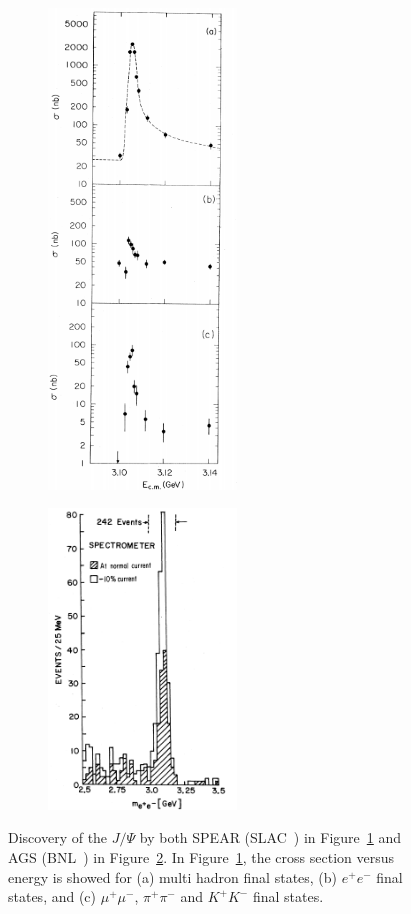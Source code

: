 	\begin{figure}[H]
		\begin{subfigure}{0.5\linewidth}
			\centering
			\includegraphics[width=5cm]{fig/chapt2/JPsi-discovery-SPEAR.png}
			\caption{\label{fig:JPsi:A}}
		\end{subfigure}
		\begin{subfigure}{0.5\linewidth}
			\centering
			\includegraphics[width=5cm]{fig/chapt2/JPsi-discovery-AGS.png}
			\caption{\label{fig:JPsi:B}}
		\end{subfigure}
		\caption{\label{fig:JPsi} Discovery of the $J/\Psi$ by both SPEAR (SLAC~\cite{RICHTER1974}) in Figure~\ref{fig:JPsi:A} and AGS (BNL~\cite{TING1974}) in Figure~\ref{fig:JPsi:B}. In Figure~\ref{fig:JPsi:A}, the cross section versus energy is showed for (a) multi hadron final states, (b) $e^+e^-$ final states, and (c) $\mu^+\mu^-$, $\pi^+\pi^-$ and $K^+K^-$ final states.}
	\end{figure}
	
